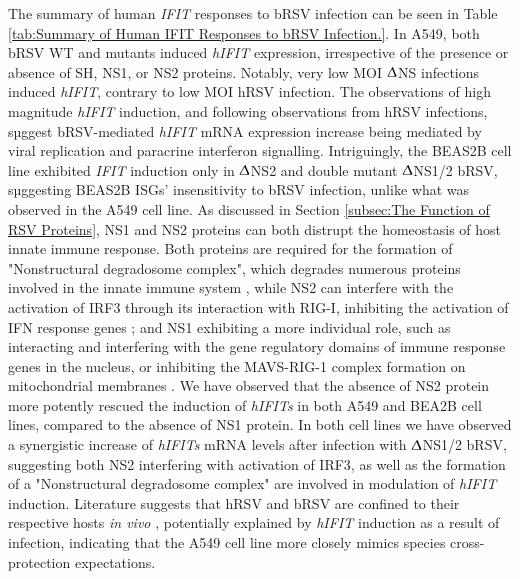 The summary of human \textit{IFIT} responses to bRSV infection can be seen in Table \ref{tab:Summary of Human IFIT Responses to bRSV Infection.}. In A549, both bRSV WT and mutants induced \textit{hIFIT} expression, irrespective of the presence or absence of SH, NS1, or NS2 proteins. Notably, very low MOI $\Updelta$NS infections induced \textit{hIFIT}, contrary to low MOI hRSV infection. The observations of high magnitude \textit{hIFIT} induction, and following observations from hRSV infections, sµggest bRSV-mediated \textit{hIFIT} mRNA expression increase being mediated by viral replication and paracrine interferon signalling. Intriguingly, the BEAS2B cell line exhibited \textit{IFIT} induction only in $\Updelta$NS2 and double mutant $\Updelta$NS1/2 bRSV, sµggesting BEAS2B ISGs' insensitivity to bRSV infection, unlike what was observed in the A549 cell line. As discussed in Section \ref{subsec:The Function of RSV Proteins}, NS1 and NS2 proteins can both distrupt the homeostasis of host innate immune response. Both proteins are required for the formation of "Nonstructural degradosome complex", which degrades numerous proteins involved in the innate immune system \cite{Boyoglu-Barnum2019BiologyDevelopment.}, while NS2 can interfere with the activation of IRF3 through its interaction with RIG-I, inhibiting the activation of IFN response genes \cite{Wright2006TheHumans}; and NS1 exhibiting a more individual role, such as interacting and interfering with the gene regulatory domains of immune response genes in the nucleus, or inhibiting the MAVS-RIG-1 complex formation on mitochondrial membranes \cite{Sedeyn2019RespiratoryResponses, Spann2004SuppressionMacrophages}. We have observed that the absence of NS2 protein more potently rescued the induction of \textit{hIFITs} in both A549 and BEA2B cell lines, compared to the absence of NS1 protein. In both cell lines we have observed a synergistic increase of \textit{hIFITs} mRNA levels after infection with $\Updelta$NS1/2 bRSV, suggesting both NS2 interfering with activation of IRF3, as well as the formation of a "Nonstructural degradosome complex" are involved in modulation of \textit{hIFIT} induction. Literature suggests that hRSV and bRSV are confined to their respective hosts \textit{in vivo} \cite{Buchholz2000ChimericVaccine}, potentially explained by \textit{hIFIT} induction as a result of infection, indicating that the A549 cell line more closely mimics species cross-protection expectations.

